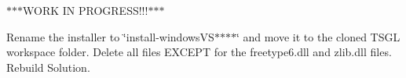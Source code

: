 $\ast$$\ast$$\ast$\-W\-O\-R\-K I\-N P\-R\-O\-G\-R\-E\-S\-S!!!$\ast$$\ast$$\ast$

Rename the installer to \char`\"{}install-\/windows\-V\-S$\ast$$\ast$$\ast$$\ast$\char`\"{} and move it to the cloned T\-S\-G\-L workspace folder. Delete all files E\-X\-C\-E\-P\-T for the freetype6.\-dll and zlib.\-dll files. Rebuild Solution. 